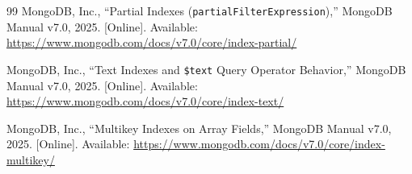 \begin{thebibliography}{99}
MongoDB, Inc., ``Partial Indexes (\texttt{partialFilterExpression}),'' MongoDB Manual v7.0, 2025. [Online]. Available: \url{https://www.mongodb.com/docs/v7.0/core/index-partial/}

MongoDB, Inc., ``Text Indexes and \texttt{\$text} Query Operator Behavior,'' MongoDB Manual v7.0, 2025. [Online]. Available: \url{https://www.mongodb.com/docs/v7.0/core/index-text/}

MongoDB, Inc., ``Multikey Indexes on Array Fields,'' MongoDB Manual v7.0, 2025. [Online]. Available: \url{https://www.mongodb.com/docs/v7.0/core/index-multikey/}

\end{thebibliography}
